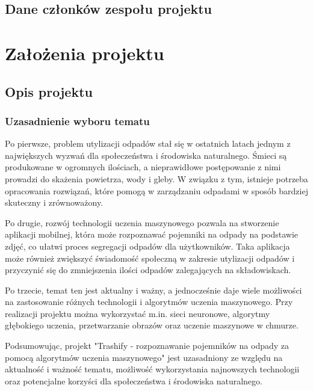 \documentclass[12pt,oneside]{book}
\begin{document}
\clearpage

\section{Dane członków zespołu projektu}

\membersTable

    \chapter{Założenia projektu}

\section{Opis projektu}

\subsection{Uzasadnienie wyboru tematu}

Po pierwsze, problem utylizacji odpadów stał się w ostatnich latach jednym z największych wyzwań dla społeczeństwa i środowiska naturalnego. Śmieci są produkowane w ogromnych ilościach, a nieprawidłowe postępowanie z nimi prowadzi do skażenia powietrza, wody i gleby. W związku z tym, istnieje potrzeba opracowania rozwiązań, które pomogą w zarządzaniu odpadami w sposób bardziej skuteczny i zrównoważony.

Po drugie, rozwój technologii uczenia maszynowego pozwala na stworzenie aplikacji mobilnej, która może rozpoznawać pojemniki na odpady na podstawie zdjęć, co ułatwi proces segregacji odpadów dla użytkowników. Taka aplikacja może również zwiększyć świadomość społeczną w zakresie utylizacji odpadów i przyczynić się do zmniejszenia ilości odpadów zalegających na składowiskach.


Po trzecie, temat ten jest aktualny i ważny, a jednocześnie daje wiele możliwości na zastosowanie różnych technologii i algorytmów uczenia maszynowego. Przy realizacji projektu można wykorzystać m.in. sieci neuronowe, algorytmy głębokiego uczenia, przetwarzanie obrazów oraz uczenie maszynowe w chmurze.

Podsumowując, projekt "Trashify - rozpoznawanie pojemników na odpady za pomocą algorytmów uczenia maszynowego" jest uzasadniony ze względu na aktualność i ważność tematu, możliwość wykorzystania najnowszych technologii oraz potencjalne korzyści dla społeczeństwa i środowiska naturalnego.
\end{document}
